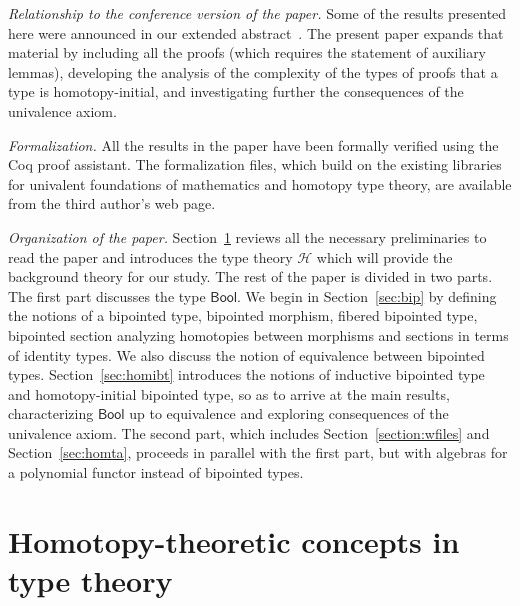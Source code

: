 \documentclass[10pt,a4paper,oneside,reqno]{amsart}
\numberwithin{equation}{section}
\theoremstyle{mythm}
\theoremstyle{mydef}
\theoremstyle{myrmk}
\newcommand{\Hint}{\mathcal{H}}
\newcommand{\Bool}{\mathsf{Bool}}
\begin{document}
\medskip

\noindent
\emph{Relationship to the conference version of the paper.} Some of the results presented here
were announced in our extended abstract~\cite{wtypes}. The present paper expands that material
by including all the proofs (which requires the statement of auxiliary lemmas), developing the
analysis of the complexity of the types of proofs that a type is homotopy-initial, and investigating further the consequences of the univalence axiom.

\smallskip

\noindent
\emph{Formalization.} All the results in the paper have been formally verified using the
Coq proof assistant. The formalization files, which build on the existing libraries for
univalent foundations of mathematics and homotopy type theory, are available from
the third author's web page.

\smallskip

\noindent
\emph{Organization of the paper.} Section~\ref{sec:bac} reviews all the necessary preliminaries to
read the paper and introduces the type theory $\Hint$ which will provide the background theory for
our study. The rest of the paper is divided in two parts. The first part discusses the type $\Bool$.
We begin in Section~\ref{sec:bip} by defining the notions of a bipointed type, bipointed morphism,
fibered bipointed type, bipointed section analyzing homotopies between morphisms and 
sections in terms of identity types. We also discuss the notion of equivalence between bipointed types.
Section~\ref{sec:homibt} introduces the notions of inductive bipointed type and homotopy-initial
bipointed type, so as to arrive at the main results, characterizing $\Bool$ up to equivalence and
exploring consequences of the univalence axiom. The second part, which includes
Section~\ref{section:wfiles} and Section~\ref{sec:homta}, proceeds in parallel with the 
first part, but with algebras for a polynomial functor instead of bipointed types. 






\section{Homotopy-theoretic concepts in type theory}
\label{sec:bac}
\end{document}
